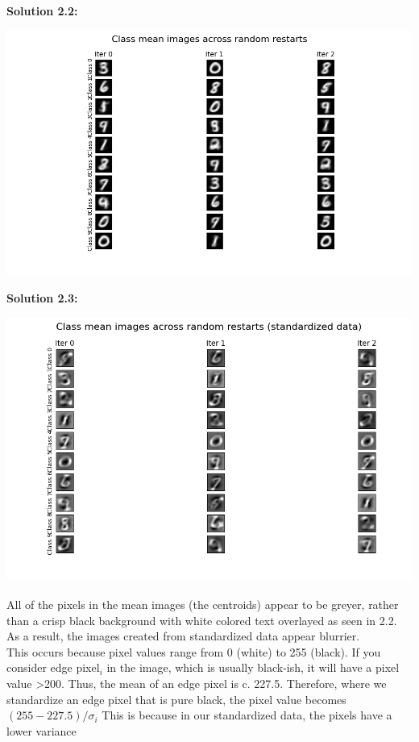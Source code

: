 \documentclass[submit]{harvardml}
\begin{document}
\noindent\textbf{Solution 2.2:}\\
\begin{center}
    \includegraphics[scale=0.6]{2.2.png}
\end{center}

\noindent\textbf{Solution 2.3:}\\
\begin{center}
    \includegraphics[scale=0.6]{2.3.png}
\end{center}
All of the pixels in the mean images (the centroids) appear to be greyer, rather than a crisp black background with white colored text overlayed as seen in 2.2. As a result, the images created from standardized data appear blurrier.\\
This occurs because pixel values range from 0 (white) to 255 (black). If you consider edge pixel$_i$ in the image, which is usually black-ish, it will have a pixel value >200. Thus, the mean of an edge pixel is c. 227.5. Therefore, where we standardize an edge pixel that is pure black, the pixel value becomes $(255 - 227.5)/ \sigma_i$
This is because in our standardized data, the pixels have a lower variance
\end{document}
